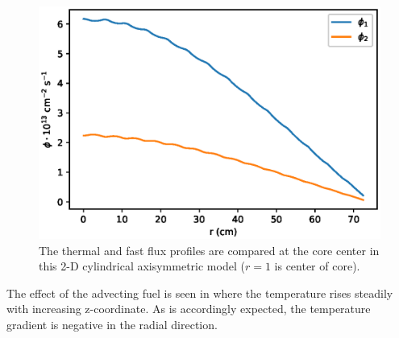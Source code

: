 \documentclass{article}
\begin{document}
\begin{figure}
  \centering
  \includegraphics{radial_group_comparison.eps}
        \caption{The thermal and fast flux profiles are compared at the 
        core center in this 2-D cylindrical axisymmetric model ($r=1$ is center of core). }
\end{figure}



The effect of the advecting fuel is seen in  where the temperature
rises steadily with increasing z-coordinate. As is accordingly expected, the temperature
gradient is negative in the radial direction.
\end{document}
